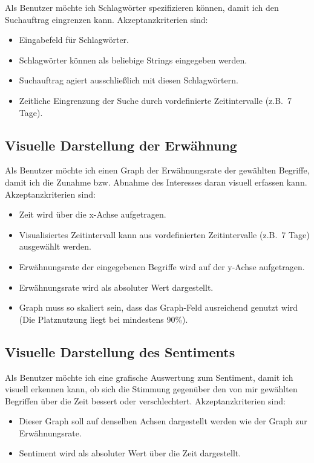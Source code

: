 \documentclass[a4paper, 10pt, conference]{IEEEtran}
\begin{document}
Als Benutzer möchte ich Schlagwörter spezifizieren können, damit ich den Suchauftrag eingrenzen kann. Akzeptanzkriterien sind:
\begin{itemize}
\item Eingabefeld für Schlagwörter.
\item Schlagwörter können als beliebige Strings eingegeben werden.
\item Suchauftrag agiert ausschließlich mit diesen Schlagwörtern.
\item Zeitliche Eingrenzung der Suche durch vordefinierte Zeitintervalle (z.B.~7 Tage).
\end{itemize}

\subsection{Visuelle Darstellung der Erwähnung}

Als Benutzer möchte ich einen Graph der Erwähnungsrate der gewählten Begriffe, damit ich die Zunahme bzw. Abnahme des Interesses daran visuell erfassen kann. Akzeptanzkriterien sind:
\begin{itemize}
\item Zeit wird über die x-Achse aufgetragen.
\item Visualisiertes Zeitintervall kann aus vordefinierten Zeitintervalle (z.B.~7 Tage) ausgewählt werden.
\item Erwähnungsrate der eingegebenen Begriffe wird auf der y-Achse aufgetragen.
\item Erwähnungsrate wird als absoluter Wert dargestellt.
\item Graph muss so skaliert sein, dass das Graph-Feld ausreichend genutzt wird (Die Platznutzung liegt bei mindestens 90\%).
\end{itemize}

\subsection{Visuelle Darstellung des Sentiments}

Als Benutzer möchte ich eine grafische Auswertung zum Sentiment, damit ich visuell erkennen kann, ob sich die Stimmung gegenüber den von mir gewählten Begriffen über die Zeit bessert oder verschlechtert. Akzeptanzkriterien sind:
\begin{itemize}
\item Dieser Graph soll auf denselben Achsen dargestellt werden wie der Graph zur Erwähnungsrate.
\item Sentiment wird als absoluter Wert über die Zeit dargestellt.
\end{itemize}
\end{document}
